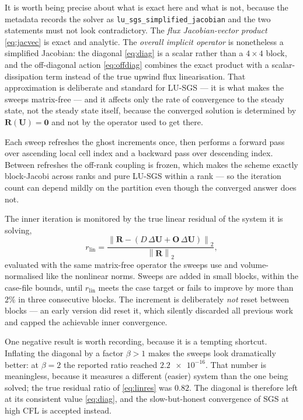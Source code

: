 It is worth being precise about what is exact here and what is not, because the
metadata records the solver as \texttt{lu\_sgs\_simplified\_jacobian} and the two
statements must not look contradictory. The \emph{flux Jacobian-vector product}
\cref{eq:jacvec} is exact and analytic. The \emph{overall implicit operator} is
nonetheless a simplified Jacobian: the diagonal \cref{eq:diag} is a scalar rather
than a $4\times4$ block, and the off-diagonal action \cref{eq:offdiag} combines the
exact product with a scalar-dissipation term instead of the true upwind flux
linearisation. That approximation is deliberate and standard for LU-SGS --- it is
what makes the sweeps matrix-free --- and it affects only the rate of convergence to
the steady state, not the steady state itself, because the converged solution is
determined by $\mathbf{R}(\mathbf{U})=\mathbf{0}$ and not by the operator used to get
there.

Each sweep refreshes the ghost increments once, then performs a forward pass over
ascending local cell index and a backward pass over descending index. Between
refreshes the off-rank coupling is frozen, which makes the scheme exactly
block-Jacobi across ranks and pure LU-SGS within a rank --- so the iteration count
can depend mildly on the partition even though the converged answer does not.

The inner iteration is monitored by the true linear residual of the system it is
solving,
\begin{equation}
  r_{\mathrm{lin}}=
  \frac{\left\|\mathbf{R}-\left(D\,\Delta\mathbf{U}+\mathbf{O}\,\Delta\mathbf{U}\right)\right\|_2}
       {\left\|\mathbf{R}\right\|_2},
  \label{eq:linres}
\end{equation}
evaluated with the same matrix-free operator the sweeps use and volume-normalised
like the nonlinear norms. Sweeps are added in small blocks, within the case-file
bounds, until $r_{\mathrm{lin}}$ meets the case target or fails to improve by more
than $2\%$ in three consecutive blocks. The increment is deliberately \emph{not}
reset between blocks --- an early version did reset it, which silently discarded
all previous work and capped the achievable inner convergence.

One negative result is worth recording, because it is a tempting shortcut.
Inflating the diagonal by a factor $\beta>1$ makes the sweeps look dramatically
better: at $\beta=2$ the reported ratio reached $\num{2.2e-16}$. That number is
meaningless, because it measures a different (easier) system than the one being
solved; the true residual ratio of \cref{eq:linres} was $0.82$. The diagonal is
therefore left at its consistent value \cref{eq:diag}, and the slow-but-honest
convergence of SGS at high CFL is accepted instead.

